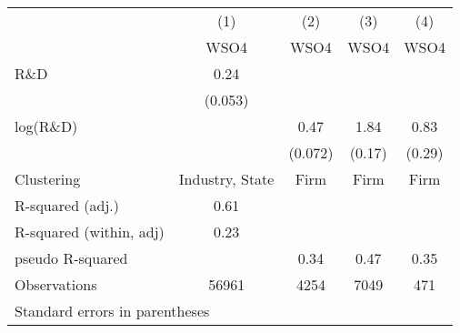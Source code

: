 {
\def\sym#1{\ifmmode^{#1}\else\(^{#1}\)\fi}
\begin{tabular}{l*{4}{c}}
\toprule
                    &\multicolumn{1}{c}{(1)}&\multicolumn{1}{c}{(2)}&\multicolumn{1}{c}{(3)}&\multicolumn{1}{c}{(4)}\\
                    &\multicolumn{1}{c}{WSO4}&\multicolumn{1}{c}{WSO4}&\multicolumn{1}{c}{WSO4}&\multicolumn{1}{c}{WSO4}\\
\midrule
R\&D                &        0.24 &                     &                     &                     \\
                    &     (0.053)         &                     &                     &                     \\
\addlinespace
log(R\&D)           &                     &        0.47&        1.84&        0.83\\
                    &                     &     (0.072)         &      (0.17)         &      (0.29)         \\
\addlinespace
\midrule
Clustering          & Industry, State         &       Firm         &       Firm         &       Firm         \\
R-squared (adj.)    &        0.61         &                     &                     &                     \\
R-squared (within, adj)&        0.23         &                     &                     &                     \\
pseudo R-squared    &                     &        0.34         &        0.47         &        0.35         \\
Observations        &       56961         &        4254         &        7049         &         471         \\
\bottomrule
\multicolumn{5}{l}{\footnotesize Standard errors in parentheses}\\
\end{tabular}
}
